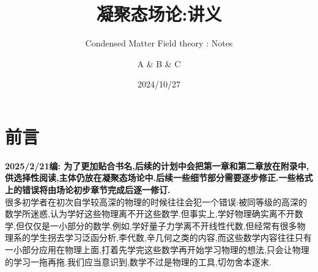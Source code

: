 \documentclass[lang=cn,newtx,10pt,scheme=chinese,thmcnt=section]{elegantbook}
\title{凝聚态场论:讲义}
\subtitle{Condensed Matter Field theory : Notes}
\author{A \& B \& C}
\institute{Group 530}
\date{2024/10/27}
\begin{document}
\maketitle
\frontmatter

\tableofcontents

\mainmatter










\chapter*{前言}
\textbf{2025/2/21编: 为了更加贴合书名,后续的计划中会把第一章和第二章放在附录中,供选择性阅读,主体仍放在凝聚态场论中.后续一些细节部分需要逐步修正.一些格式上的错误将由场论初步章节完成后逐一修订.}\\


很多初学者在初次自学较高深的物理的时候往往会犯一个错误:被同等级的高深的数学所迷惑,认为学好这些物理离不开这些数学.但事实上,学好物理确实离不开数学,但仅仅是一小部分的数学.例如,学好量子力学离不开线性代数,但经常有很多物理系的学生拐去学习泛函分析,李代数,辛几何之类的内容,而这些数学内容往往只有一小部分应用在物理上面,打着先学完这些数学再开始学习物理的想法,只会让物理的学习一拖再拖.我们应当意识到,数学不过是物理的工具,切勿舍本逐末.
\end{document}
